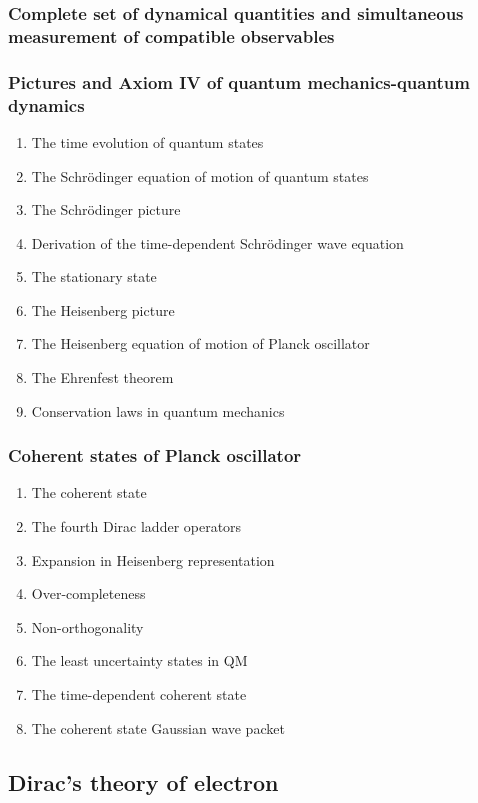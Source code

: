 \documentclass[12pt]{article}
\numberwithin{equation}{section}
\begin{document}
\subsubsection{Complete set of dynamical quantities and simultaneous measurement of compatible observables}
\subsubsection{Pictures and Axiom IV of quantum mechanics-quantum dynamics}
\begin{enumerate}
\item The time evolution of quantum states
\item The Schr\"{o}dinger equation of motion of quantum states
\item The Schr\"{o}dinger picture
\item Derivation of the time-dependent Schr\"{o}dinger wave equation
\item The stationary state 
\item The Heisenberg picture
\item The Heisenberg equation of motion of Planck oscillator
\item The Ehrenfest theorem
\item Conservation laws in quantum mechanics
\end{enumerate}
\subsubsection{Coherent states of Planck oscillator}
\begin{enumerate}
\item The coherent state
\item The fourth Dirac ladder operators
\item Expansion in Heisenberg representation
\item Over-completeness
\item Non-orthogonality
\item The least uncertainty states in QM
\item The time-dependent coherent state
\item The coherent state Gaussian wave packet
\end{enumerate}
\subsection{Dirac's theory of electron}
\end{document}
